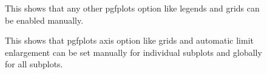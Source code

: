 \documentclass[a4paper,11pt]{article}
\begin{document}
\begin{figure}
\centering

\caption{This shows that any other pgfplots option like legends and
         grids can be enabled manually.}
\end{figure}

\begin{figure}
\centering

\caption{This shows that pgfplots axis option like grids and automatic
         limit enlargement can be set manually for individual subplots
         and globally for all subplots.}
\end{figure}
\end{document}
